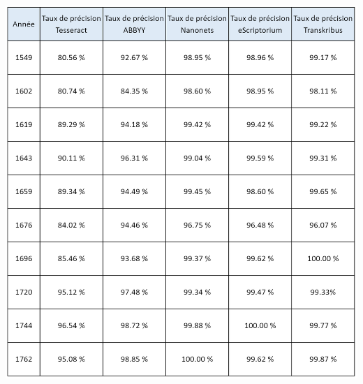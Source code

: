 \documentclass[a4paper,12pt,twoside]{book}
\begin{document}
\includegraphics[width=6in,height=6.63889in]{vertopal_157ae480aa4a4b07be198b586a812241/media/image23.png}
\end{document}
